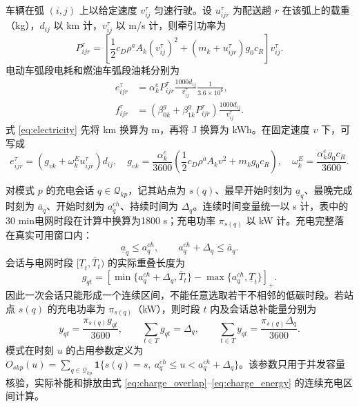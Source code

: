 \documentclass{setp-new}
\begin{document}
车辆在弧 $(i,j)$ 上以给定速度 $v_{ij}^\tau$ 匀速行驶。设 $u_{ijr}^\tau$ 为配送趟 $r$ 在该弧上的载重（kg），$d_{ij}$ 以 km 计，$v_{ij}^\tau$ 以 m/s 计，则牵引功率为
\begin{equation}
P_{ijr}^{\tau}=\left[\frac{1}{2}c_D\rho^a A_k(v_{ij}^{\tau})^2+
\left(m_k+u_{ijr}^{\tau}\right)g_0c_R\right]v_{ij}^{\tau}.
\label{eq:power}
\end{equation}
电动车弧段电耗和燃油车弧段油耗分别为
\begin{align}
e_{ijr}^{\tau}&=\alpha_k^e P_{ijr}^{\tau}
\frac{1000d_{ij}}{v_{ij}^{\tau}}\frac{1}{3.6\times10^6},\label{eq:electricity}\\
f_{ijr}^{\tau}&=\left(\beta_{0k}^g+\beta_{1k}^gP_{ijr}^{\tau}\right)
\frac{1000d_{ij}}{v_{ij}^{\tau}}.\label{eq:fuel}
\end{align}
式 \eqref{eq:electricity} 先将 km 换算为 m，再将 J 换算为 kWh。在固定速度 $v$ 下，可写成
\begin{equation}
e_{ijr}^{\tau}=(g_{vk}+\omega_k^E u_{ijr}^{\tau})d_{ij},\quad
g_{vk}=\frac{\alpha_k^e}{3600}\left(\frac{1}{2}c_D\rho^a A_kv^2+m_kg_0c_R\right),\quad
\omega_k^E=\frac{\alpha_k^eg_0c_R}{3600}.
\label{eq:ev_energy_fixed_speed}
\end{equation}

对模式 $p$ 的充电会话 $q\in\mathcal Q_{kp}$，记其站点为 $s(q)$、最早开始时刻为 $\underline a_q$、最晚完成时刻为 $\overline a_q$、开始时刻为 $a_q^{ch}$、持续时间为 $\Delta_q$。连续时间变量统一以 s 计，表中的30 min电网时段在计算中换算为1800 s；充电功率 $\pi_{s(q)}$ 以 kW 计。充电完整落在真实可用窗口内：
\begin{equation}
\underline a_q\le a_q^{ch},\qquad a_q^{ch}+\Delta_q\le\overline a_q.
\label{eq:depot_charge_complete}
\end{equation}
会话与电网时段 $[\underline T_t,\overline T_t)$ 的实际重叠长度为
\begin{equation}
g_{qt}=\left[\min\{a_q^{ch}+\Delta_q,\overline T_t\}
-\max\{a_q^{ch},\underline T_t\}\right]_+ .
\label{eq:charge_overlap}
\end{equation}
因此一次会话只能形成一个连续区间，不能任意选取若干不相邻的低碳时段。若站点 $s(q)$ 的充电功率为 $\pi_{s(q)}$（kW），则时段 $t$ 内及会话总补能量分别为
\begin{equation}
y_{qt}=\frac{\pi_{s(q)}g_{qt}}{3600},\qquad
\sum_{t\in T}g_{qt}=\Delta_q,\qquad
\sum_{t\in T}y_{qt}=\frac{\pi_{s(q)}\Delta_q}{3600}.
\label{eq:charge_energy}
\end{equation}
模式在时刻 $u$ 的占用参数定义为
$O_{skp}(u)=\sum_{q\in\mathcal Q_{kp}}\mathbf 1\{s(q)=s,\ a_q^{ch}\le u<a_q^{ch}+\Delta_q\}$。该参数只用于并发容量核验，实际补能和排放由式 \eqref{eq:charge_overlap}--\eqref{eq:charge_energy} 的连续充电区间计算。
\end{document}
